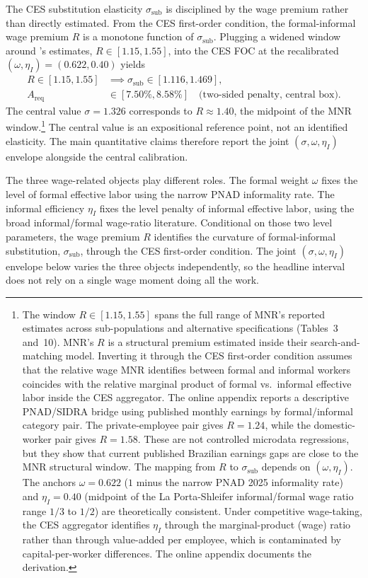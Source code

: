 The CES substitution elasticity $\sigma_{\text{sub}}$ is disciplined by the wage premium rather than directly estimated. From the CES first-order condition, the formal-informal wage premium $R$ is a monotone function of $\sigma_{\text{sub}}$. Plugging a widened window around \citeauthor{MeghirNaritaRobin2015}'s estimates, $R\in[1.15,1.55]$, into the CES FOC at the recalibrated $(\omega,\eta_I)=(0.622,0.40)$ yields
\begin{equation}\label{eq:sigma_interval}
\begin{aligned}
R\in[1.15,1.55]&\implies \sigma_{\text{sub}}\in[1.116,1.469],\\
A_{\text{req}}&\in[7.50\%,8.58\%]\quad\text{(two-sided penalty, central box).}
\end{aligned}
\end{equation}
The central value $\sigma=1.326$ corresponds to $R\approx 1.40$, the midpoint of the MNR window.\footnote{The window $R\in[1.15,1.55]$ spans the full range of MNR's reported estimates across sub-populations and alternative specifications (Tables~3 and~10). MNR's $R$ is a structural premium estimated inside their search-and-matching model. Inverting it through the CES first-order condition assumes that the relative wage MNR identifies between formal and informal workers coincides with the relative marginal product of formal vs.\ informal effective labor inside the CES aggregator. The online appendix reports a descriptive PNAD/SIDRA bridge using published monthly earnings by formal/informal category pair. The private-employee pair gives $R=1.24$, while the domestic-worker pair gives $R=1.58$. These are not controlled microdata regressions, but they show that current published Brazilian earnings gaps are close to the MNR structural window. The mapping from $R$ to $\sigma_{\text{sub}}$ depends on $(\omega,\eta_I)$. The anchors $\omega=0.622$ ($1$ minus the narrow PNAD 2025 informality rate) and $\eta_I=0.40$ (midpoint of the La Porta-Shleifer informal/formal wage ratio range $1/3$ to $1/2$) are theoretically consistent. Under competitive wage-taking, the CES aggregator identifies $\eta_I$ through the marginal-product (wage) ratio rather than through value-added per employee, which is contaminated by capital-per-worker differences. The online appendix documents the derivation.} The central value is an expositional reference point, not an identified elasticity. The main quantitative claims therefore report the joint $(\sigma,\omega,\eta_I)$ envelope alongside the central calibration.

The three wage-related objects play different roles. The formal weight $\omega$ fixes the level of formal effective labor using the narrow PNAD informality rate. The informal efficiency $\eta_I$ fixes the level penalty of informal effective labor, using the broad informal/formal wage-ratio literature. Conditional on those two level parameters, the wage premium $R$ identifies the curvature of formal-informal substitution, $\sigma_{\text{sub}}$, through the CES first-order condition. The joint $(\sigma,\omega,\eta_I)$ envelope below varies the three objects independently, so the headline interval does not rely on a single wage moment doing all the work.

